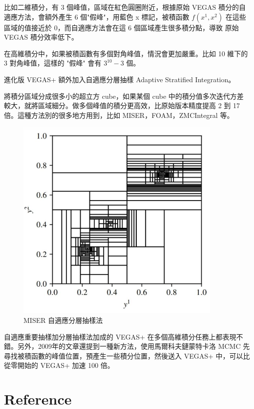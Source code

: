 \documentclass[10pt,UTF8]{ctexart}
\begin{document}
比如二維積分，有 3 個峰值，區域在紅色圓圈附近，根據原始 VEGAS 積分的自適應方法，會額外產生 6 個"假峰"，用藍色 x 標記，被積函數 $f(x^{1}, x^{2})$ 在這些區域的值接近於 0，而自適應方法會在這 6 個區域產生很多積分點，導致 原始 VEGAS 積分效率低下。

在高維積分中，如果被積函數有多個對角峰值，情況會更加嚴重。比如 10 維下的 3 對角峰值，這樣的 "假峰" 會有 $3^{10} - 3$ 個。

進化版 VEGAS+ 額外加入自適應分層抽樣 Adaptive Stratified Integration。

將積分區域分成很多小的超立方 cube，如果某個 cube 中的積分值多次迭代方差較大，就將區域細分。做多個峰值的積分更高效，比原始版本精度提高 2 到 17 倍。這種方法別的很多地方用到，比如 MISER，FOAM，ZMCIntegral 等。

\begin{figure}[H]
\centering 
\includegraphics[width=0.90\textwidth]{w15-lab-10.png} 
\caption{MISER 自適應分層抽樣法}
\label{Test}
\end{figure}

自適應重要抽樣加分層抽樣法加成的 VEGAS+ 在多個高維積分任務上都表現不錯。另外，2009年的文章還提到一種新方法，使用馬爾科夫鏈蒙特卡洛 MCMC 先尋找被積函數的峰值位置，預產生一些積分位置，然後送入 VEGAS+ 中，可以比從零開始的 VEGAS+ 加速 100 倍。

\section{Reference}
\end{document}
